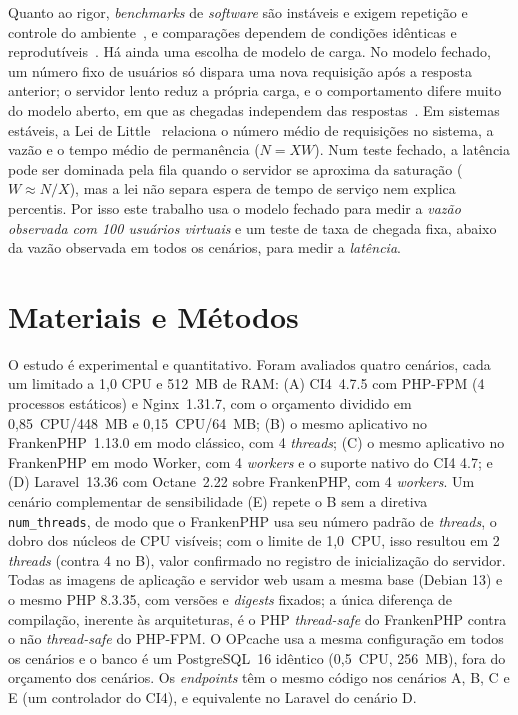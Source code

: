 \documentclass[sigconf, nonacm, screen, language=portuguese, language=spanish, language={main=english}]{acmart}
\begin{document}
Quanto ao rigor, \textit{benchmarks} de \textit{software} são instáveis e exigem repetição e controle do ambiente~\cite{laaber2021}, e comparações dependem de condições idênticas e reprodutíveis~\cite{zhan2022,brunst2022,jia2013}. Há ainda uma escolha de modelo de carga. No modelo fechado, um número fixo de usuários só dispara uma nova requisição após a resposta anterior; o servidor lento reduz a própria carga, e o comportamento difere muito do modelo aberto, em que as chegadas independem das respostas~\cite{schroeder2006,grafanaopen}. Em sistemas estáveis, a Lei de Little~\cite{little1961} relaciona o número médio de requisições no sistema, a vazão e o tempo médio de permanência ($N=XW$). Num teste fechado, a latência pode ser dominada pela fila quando o servidor se aproxima da saturação ($W\approx N/X$), mas a lei não separa espera de tempo de serviço nem explica percentis. Por isso este trabalho usa o modelo fechado para medir a \emph{vazão observada com 100 usuários virtuais} e um teste de taxa de chegada fixa, abaixo da vazão observada em todos os cenários, para medir a \emph{latência}.

\section{Materiais e Métodos}
O estudo é experimental e quantitativo. Foram avaliados quatro cenários, cada um limitado a 1,0 CPU e 512~MB de RAM: (A) CI4~4.7.5 com PHP-FPM (4 processos estáticos) e Nginx~1.31.7, com o orçamento dividido em 0,85~CPU/448~MB e 0,15~CPU/64~MB; (B) o mesmo aplicativo no FrankenPHP~1.13.0 em modo clássico, com 4 \textit{threads}; (C) o mesmo aplicativo no FrankenPHP em modo Worker, com 4 \textit{workers} e o suporte nativo do CI4 4.7; e (D) Laravel~13.36 com Octane~2.22 sobre FrankenPHP, com 4 \textit{workers}. Um cenário complementar de sensibilidade (E) repete o B sem a diretiva \texttt{num\_threads}, de modo que o FrankenPHP usa seu número padrão de \textit{threads}, o dobro dos núcleos de CPU visíveis; com o limite de 1,0~CPU, isso resultou em 2 \textit{threads} (contra 4 no B), valor confirmado no registro de inicialização do servidor. Todas as imagens de aplicação e servidor web usam a mesma base (Debian 13) e o mesmo PHP 8.3.35, com versões e \textit{digests} fixados; a única diferença de compilação, inerente às arquiteturas, é o PHP \textit{thread-safe} do FrankenPHP contra o não \textit{thread-safe} do PHP-FPM. O OPcache usa a mesma configuração em todos os cenários e o banco é um PostgreSQL~16 idêntico (0,5~CPU, 256~MB), fora do orçamento dos cenários. Os \textit{endpoints} têm o mesmo código nos cenários A, B, C e E (um controlador do CI4), e equivalente no Laravel do cenário D.
\end{document}
